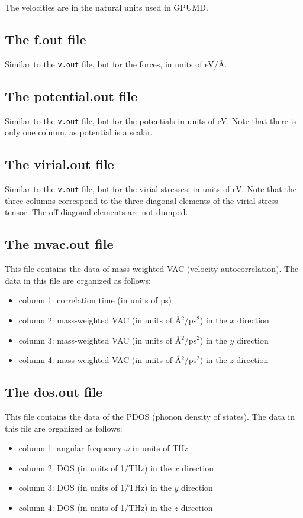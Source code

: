 \documentclass[12pt,a4paper]{report}
\begin{document}
The velocities are in the natural units used in GPUMD.

\subsection{The f.out file}

Similar to the \verb"v.out" file, but for the forces, in units of eV/\AA.

\subsection{The potential.out file}

Similar to the \verb"v.out" file, but for the potentials in units of eV. Note that there is
only one column, as potential is a scalar.

\subsection{The virial.out file}

Similar to the \verb"v.out" file, but for the virial stresses, in units of eV.
Note that the three columns correspond to the three diagonal elements
of the virial stress tensor. The off-diagonal elements are not dumped.

\subsection{The mvac.out file}
This file contains the data of mass-weighted VAC (velocity autocorrelation). The data in this file are organized as follows:
\begin{itemize}
\item column 1: correlation time (in units of ps)
\item column 2: mass-weighted VAC (in units of \AA$^2$/ps$^2$) in the $x$ direction
\item column 3: mass-weighted VAC (in units of \AA$^2$/ps$^2$) in the $y$ direction
\item column 4: mass-weighted VAC (in units of \AA$^2$/ps$^2$) in the $z$ direction
\end{itemize}

\subsection{The dos.out file}
This file contains the data of the PDOS (phonon density of states). The data in this file are organized as follows:
\begin{itemize}
\item column 1: angular frequency $\omega$ in units of THz
\item column 2: DOS (in units of 1/THz) in the $x$ direction
\item column 3: DOS (in units of 1/THz) in the $y$ direction
\item column 4: DOS (in units of 1/THz) in the $z$ direction
\end{itemize}
\end{document}
